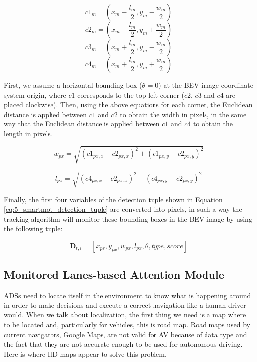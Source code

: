 \[
c1_{m} = (x_{m}-\frac{l_{m}}{2},y_{m}-\frac{w_{m}}{2}) \]
\[
c2_{m} = (x_{m}-\frac{l_{m}}{2},y_{m}+\frac{w_{m}}{2}) \]
\[
c3_{m} = (x_{m}+\frac{l_{m}}{2},y_{m}-\frac{w_{m}}{2}) \]
\[
c4_{m} = (x_{m}+\frac{l_{m}}{2},y_{m}+\frac{w_{m}}{2}) \]

First, we assume a horizontal bounding box ($\theta$ = 0) at the BEV image coordinate system origin, where $\textit{c1}$ corresponds to the top-left corner ($\textit{c2}$, $\textit{c3}$ and $\textit{c4}$ are placed clockwise). Then, using the above equations for each corner, the Euclidean distance is applied between $\textit{c1}$ and $\textit{c2}$ to obtain the width in pixels, in the same way that the Euclidean distance is applied between $\textit{c1}$ and $\textit{c4}$ to obtain the length in pixels.

\begin{equation}
\label{widthpixels}
w_{px} = \sqrt{(c1_{px,x}-c2_{px,x})^2 + (c1_{px,y}-c2_{px,y})^2}
\end{equation}

\begin{equation}
\label{lengthpixels}
l_{px} = \sqrt{(c4_{px,x}-c2_{px,x})^2 + (c4_{px,y}-c2_{px,y})^2}
\end{equation}

Finally, the first four variables of the detection tuple shown in Equation \ref{eq:5_smartmot_detection_tuple} are converted into pixels, in such a way the tracking algorithm will monitor these bounding boxes in the BEV image by using the following tuple:

\begin{equation}
	\label{detpx}
	\textbf{D}_{t,i} = [x_{px},y_{px},w_{px},l_{px},\theta,type,score]
\end{equation}

\subsection{Monitored Lanes-based Attention Module}
\label{subsec:4_smartmot_mlam}

\acp{ADS} need to locate itself in the environment to know what is happening around in order to make decisions and execute a correct navigation like a human driver would. When we talk about localization, the first thing we need is a map where to be located and, particularly for vehicles, this is road map. Road maps used by current navigators, \eg Google Maps, are not valid for AV because of data type and the fact that they are not accurate enough to be used for autonomous driving. Here is where HD maps appear to solve this problem.

